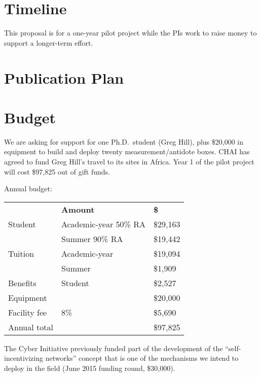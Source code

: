 \documentclass[11pt]{article}
\newcommand{\slim}{\vspace{\baselineskip}}
\begin{document}
\section{Timeline}

This proposal is for a one-year pilot project while the PIs work to
raise money to support a longer-term effort.

\section{Publication Plan}

\section{Budget}

We are asking for support for one Ph.D.~student (Greg Hill), plus
\$20,000 in equipment to build and deploy twenty measurement/antidote
boxes. CHAI has agreed to fund Greg Hill's travel to its sites in
Africa. Year 1 of the pilot project will cost \$97,825 out of gift
funds.

\slim

\noindent Annual budget:

\slim

\noindent \begin{tabular}{ll|l}
& \bf Amount & \bf \$ \\
Student & Academic-year 50\% RA & \$29,163 \\
        & Summer 90\% RA & \$19,442 \\

Tuition & Academic-year & \$19,094 \\
        & Summer        & \$1,909 \\

Benefits & Student & \$2,527 \\

Equipment &         & \$20,000 \\

\hline

Facility fee & 8\% & \$5,690 \\
Annual total & & \$97,825 \\

\end{tabular}

\slim

The Cyber Initiative previously funded part of the development of the
``self-incentivizing networks'' concept that is one of the mechanisms
we intend to deploy in the field (June 2015 funding round, \$30,000).

{\footnotesize



}
\end{document}

